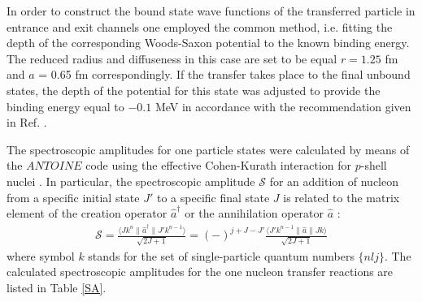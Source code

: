 \documentclass[10pt]{iopart}
\begin{document}
In order to construct the bound state wave functions of the transferred particle in entrance and exit channels one employed the common method, i.e. fitting the depth of the corresponding Woods-Saxon potential to the known binding energy. The reduced radius and diffuseness in this case are set to be equal $r = 1.25$ fm and $a$ = 0.65 fm correspondingly. If the transfer takes place to the final unbound states, the depth of the potential for this state was adjusted to provide the binding energy equal to $-0.1$ MeV in accordance with the recommendation given in Ref. \cite{harakeh1980}.


The spectroscopic amplitudes for one particle states were calculated by means of the $ANTOINE$ code \cite{antoine}  using the effective Cohen-Kurath interaction for $p$-shell nuclei \cite{cohen1965}. In particular, the spectroscopic amplitude  $\mathcal{S}$ for an addition of nucleon from a specific initial state $J'$ to a specific final state $J$ is related to the matrix element of the creation operator $\hat{a}^\dagger$ or the annihilation operator $\hat{a}$ \cite{brown2017}:
\begin{eqnarray}\label{eq:SA}
\mathcal{S} = \frac{\langle J k^n \| \hat{a}^\dagger \| J' k^{n-1} \rangle}{\sqrt{2J+1}} = (-)^{j+J-J'} \frac{\langle J' k^{n-1} \| \hat{a} \| J k \rangle}{\sqrt{2J+1}}
\end{eqnarray}
where symbol $k$ stands for the set of single-particle quantum numbers $\{nlj\}$. The calculated spectroscopic amplitudes for the one nucleon transfer reactions are listed in Table \ref{SA}.
\end{document}
